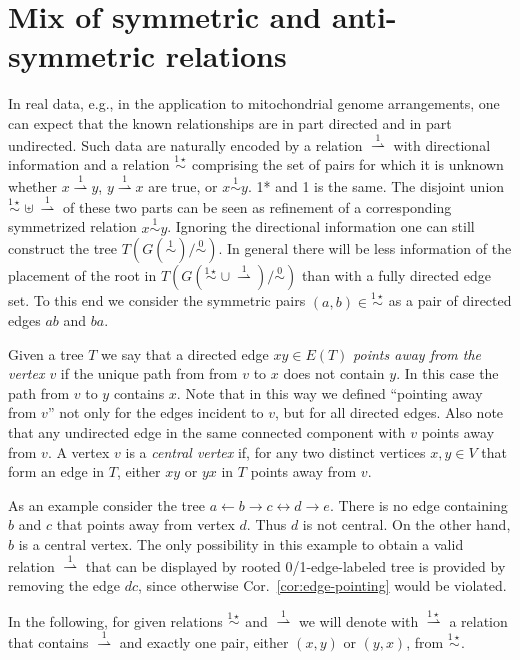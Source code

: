 \documentclass[smallextended]{svjour3}
\newcommand{\rev}[1]{\begingroup\color{blue}#1\endgroup}
\newcommand{\TODO}[1]{\begingroup\color{red}#1\endgroup}
\newcommand{\Ro}{\mathrel{\overset{0}{\sim}}}
\newcommand{\Rl}{\mathrel{\overset{1}{\sim}}}
\newcommand{\Rlstar}{\mathrel{\overset{1\star}{\sim}}}
\newcommand{\Rldstar}{\mathrel{\overset{1\star}{\rightharpoonup}}}
\newcommand{\Rld}{\mathrel{\overset{1}{\rightharpoonup}}}
\begin{document}
\section{Mix of symmetric and anti-symmetric relations}
\label{sect:mixed}

In real data, e.g., in the application to mitochondrial genome
arrangements, one can expect that the known relationships are in part
directed and in part undirected. Such data are naturally encoded by a
relation $\Rld$ with directional information and a relation $\Rlstar$
comprising the set of pairs for which it is unknown whether $x\Rld y$,
$y\Rld x$ are true, \rev{or $x\Rl y$}. \TODO{1* and 1 is the same}. The
disjoint union $\Rlstar\uplus\Rld$ of these two parts can be seen as
refinement of a corresponding symmetrized relation $x\Rl y$.  Ignoring the
directional information one can still construct the tree $T(G(\Rl)/\Ro)$.
In general there will be less information of the placement of the root in
$T(G(\Rlstar\cup\Rld)/\Ro)$ than with a fully directed edge set. To this
end we consider the symmetric pairs $(a,b)\in\Rlstar$ as a pair of directed
edges $ab$ and $ba$.

Given a tree $T$ we say that a directed edge $xy \in E(T)$ \emph{points
  away from the vertex $v$} if the unique path from from $v$ to $x$ does
not contain $y$. In this case the path from $v$ to $y$ contains $x$.  Note
that in this way we defined ``pointing away from $v$'' not only for the
edges incident to $v$, but for all directed edges. Also note that any
undirected edge in the same connected component with $v$ points away from
$v$.  A vertex $v$ is a \emph{central vertex} if, for any two distinct
vertices $x,y\in V$ that form an edge in $T$, either $xy$ or $yx$ in $T$
points away from $v$.

As an example consider the tree $a\leftarrow b\rightarrow c \leftrightarrow
d\rightarrow e$.  There is no edge containing $b$ and $c$ that points away
from vertex $d$.  Thus $d$ is not central. On the other hand, $b$ is a
central vertex. The only possibility in this example to obtain a valid
relation $\Rld$ that can be displayed by rooted 0/1-edge-labeled tree is
provided by removing the edge $dc$, since otherwise Cor.\
\ref{cor:edge-pointing} would be violated.

In the following, for given relations $\Rlstar$ and $\Rld$ we will denote
with $\Rldstar$ a relation that contains $\Rld$ and exactly one pair,
either $(x,y)$ or $(y,x)$, from $\Rlstar$.
\end{document}
